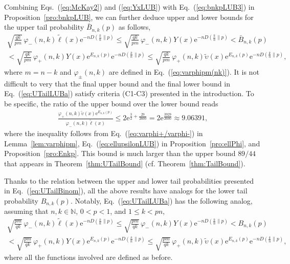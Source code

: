 \documentclass[aop]{imsart}
\theoremstyle{plain}
\theoremstyle{remark}
\newcommand{\rme}{\mathrm{e}}
\newcommand{\bbN}{\mathbb{N}}
\newcommand{\1}{\operatorname{\uppercase\expandafter{\romannumeral1}}}
\newcommand{\2}{\operatorname{\uppercase\expandafter{\romannumeral2}}}
\newcommand{\3}{\operatorname{\uppercase\expandafter{\romannumeral3}}}
\newcommand{\4}{\operatorname{\uppercase\expandafter{\romannumeral4}}}
\newcommand{\5}{\operatorname{\uppercase\expandafter{\romannumeral5}}}
\newcommand{\6}{\operatorname{\uppercase\expandafter{\romannumeral6}}}
\newcommand{\7}{\operatorname{\uppercase\expandafter{\romannumeral7}}}
\newcommand{\8}{\operatorname{\uppercase\expandafter{\romannumeral8}}}
\newcommand{\9}{\operatorname{\uppercase\expandafter{\romannumeral9}}}
\newcommand{\eref}[1]{Eq.~\textup{(\ref{#1})}}
\newcommand{\eqsref}[2]{Eqs.~(\ref{#1}) and (\ref{#2})}
\newcommand{\thref}[1]{Theorem~\ref{#1}}
\newcommand{\lref}[1]{Lemma~\ref{#1}}
\newcommand{\pref}[1]{Proposition~\ref{#1}}
\begin{document}
\begin{appendix}
Combining \eqsref{eq:McKay2}{eq:YxLUB} with \eref{eq:bnkpLUB3} in \pref{pro:bnkpLUB}, we can further deduce upper and lower bounds for the upper tail probability $\bar{B}_{n,k}(p)$ as follows,
\begin{gather}\label{eq:UTailLUBa}
\sqrt{\frac{qk}{pm}}\, \varphi_-(n,k)\tilde{\ell} (x)
\rme^{-nD(\frac{k}{n}\| p)}\leq \sqrt{\frac{qk}{pm}}\, \varphi_-(n,k)Y(x)
\rme^{-nD(\frac{k}{n}\| p)}
< \bar{B}_{n,k}(p) \\
< \sqrt{\frac{qk}{pm}}\, \varphi_+(n,k)Y(x) \rme^{E_{n,k}(p)}\rme^{-nD(\frac{k}{n}\| p)} \leq  \sqrt{\frac{qk}{pm}}\, \varphi_+(n,k)\tilde{\upsilon} (x) \rme^{E_{n,k}(p)}\rme^{-nD(\frac{k}{n}\| p)},\nonumber
\end{gather}
where $m=n-k$ and $\varphi_\pm(n,k)$ are defined in \eref{eq:varphipm(nk)}. It is not difficult to very that  the final upper bound and the final lower bound in \eref{eq:UTailLUBa} satisfy criteria (C1-C3) presented in the introduction. To be specific, the ratio of the upper bound over the  lower bound reads 
\begin{align}
\frac{\varphi_+(n,k)\tilde{\upsilon} (x) \rme^{E_{n,k}(p)}}{\varphi_-(n,k)\tilde{\ell} (x)}\leq 2\rme^{\frac{3}{2}+\frac{29}{2600}}=2\rme^{\frac{3929}{2600}}\approx 9.06391,
\end{align}
where the inequality follows from \eref{eq:varphi+/varphi-} in  \lref{lem:varphipm}, \eref{eq:ellupsilonLUB} in  \pref{pro:ellPhi}, and \pref{pro:Enkp}. This bound is much larger than the upper bound $89/44$ that appears in \thref{thm:UTailBound} (cf. \thref{thm:TailBound}). 




Thanks to the relation between the upper and lower tail probabilities presented in \eref{eq:UTailBinom}, all the above results have analogs for the lower tail probability $B_{n,k}(p)$. Notably, \eref{eq:UTailLUBa} has the following analog, assuming that $n,k\in \bbN$, $0<p<1$, and $1\leq k<pn$,
\begin{gather}
\sqrt{\frac{pm}{qk}}\, \varphi_-(n,k)\tilde{\ell} (x)
\rme^{-nD(\frac{k}{n}\| p)}\leq \sqrt{\frac{pm}{qk}}\, \varphi_-(n,k)Y(x)
\rme^{-nD(\frac{k}{n}\| p)}
< B_{n,k}(p) \\
< \sqrt{\frac{pm}{qk}}\, \varphi_+(n,k)Y(x) \rme^{E_{n,k}(p)}\rme^{-nD(\frac{k}{n}\| p)} \leq  \sqrt{\frac{pm}{qk}}\, \varphi_+(n,k)\tilde{\upsilon} (x) \rme^{E_{n,k}(p)}\rme^{-nD(\frac{k}{n}\| p)},\nonumber
\end{gather}
where all the functions involved are defined as before. 




\end{appendix}
\end{document}
